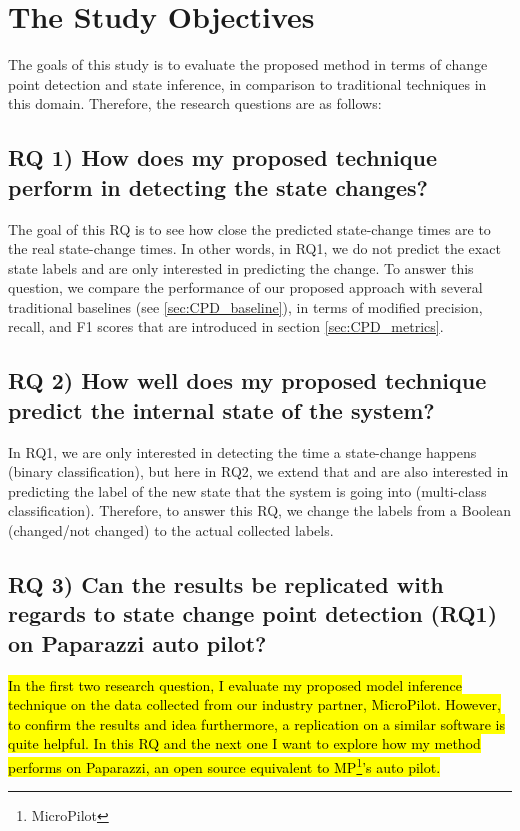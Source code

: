 \section{The Study Objectives}
The goals of this study is to evaluate the proposed method in terms of change point detection and state inference, in comparison to traditional techniques in this domain. Therefore, the research questions are as follows:

\subsection{RQ 1) How does my proposed technique perform in detecting the state changes?}
The goal of this RQ is to see how close the predicted state-change times are to the real state-change times.  In other words, in RQ1, we do not predict the exact state labels and are only interested in predicting the change.
To answer this question, we compare the performance of our proposed approach with several traditional baselines (see \ref{sec:CPD_baseline}), in terms of modified precision, recall, and F1 scores that are introduced in section \ref{sec:CPD_metrics}.


\subsection{RQ 2) How well does my proposed technique predict the internal state of the system?}
In RQ1, we are only interested in detecting the time a state-change happens (binary classification), but here in RQ2, we extend that and are also interested in predicting the label of the new state that the system is going into (multi-class classification).  
Therefore, to answer this RQ, we change the labels from a Boolean (changed/not changed) to the actual collected labels. 

\subsection{RQ 3) Can the results be replicated with regards to state change point detection (RQ1) on Paparazzi auto pilot?}
\hl{In the first two research question, I evaluate my proposed model inference technique on the data collected from our industry partner, MicroPilot. However, to confirm the results and idea furthermore, a replication on a similar software is quite helpful. 
In this RQ and the next one I want to explore how my method performs on Paparazzi, an open source equivalent to MP\footnote{MicroPilot}'s auto pilot.}


